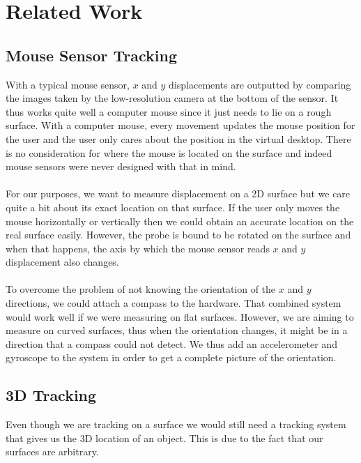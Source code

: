\section{Related Work}

\subsection{Mouse Sensor Tracking}

With a typical mouse sensor, $x$ and $y$ displacements are outputted by comparing the images taken by the low-resolution camera at the bottom of the sensor. It thus works quite well a computer mouse since it just needs to lie on a rough surface. With a computer mouse, every movement updates the mouse position for the user and the user only cares about the position in the virtual desktop. There is no consideration for where the mouse is located on the surface and indeed mouse sensors were never designed with that in mind.\\
\\
For our purposes, we want to measure displacement on a 2D surface but we care quite a bit about its exact location on that surface. If the user only moves the mouse horizontally or vertically then we could obtain an accurate location on the real surface easily. However, the probe is bound to be rotated on the surface and when that happens, the axis by which the mouse sensor reads $x$ and $y$ displacement also changes.\\
\\
To overcome the problem of not knowing the orientation of the $x$ and $y$ directions, we could attach a compass to the hardware. That combined system would work well if we were measuring on flat surfaces. However, we are aiming to measure on curved surfaces, thus when the orientation changes, it might be in a direction that a compass could not detect. We thus add an accelerometer and gyroscope to the system in order to get a complete picture of the orientation. 


\subsection{3D Tracking}

Even though we are tracking on a surface we would still need a tracking system that gives us the 3D location of an object. This is due to the fact that our surfaces are arbitrary. 


